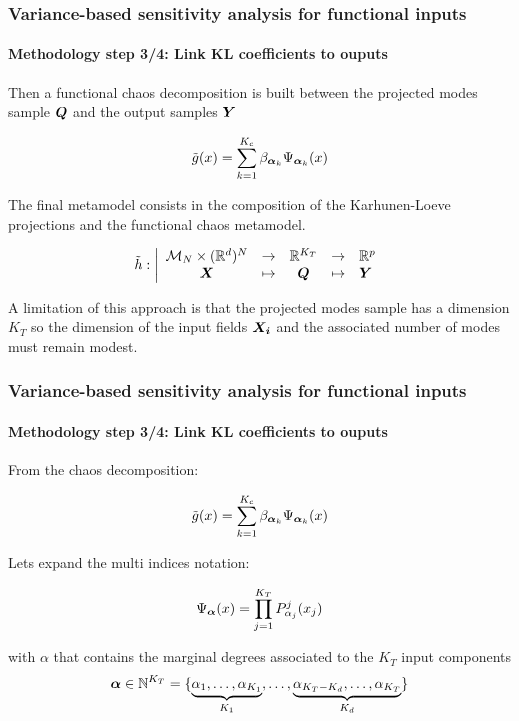 \documentclass[aspectratio=169]{beamer}
\begin{document}
\begin{frame}
\frametitle{Variance-based sensitivity analysis for functional inputs}

\framesubtitle{Methodology step 3/4: Link KL coefficients to ouputs}

Then a functional chaos decomposition is built between the projected modes\\
sample ${{\mathbf{\boldsymbol{{{\mathbf{\boldsymbol{{Q}}}}}}}}}$ and the output samples ${{\mathbf{\boldsymbol{{{\mathbf{\boldsymbol{{Y}}}}}}}}}$

$$
\tilde{g}(x) = \sum_{k=1}^{K_c} \beta_{{\mathbf{\boldsymbol{{\alpha}}}}_k} \Psi_{{\mathbf{\boldsymbol{{\alpha}}}}_k}(x)
$$

The final metamodel consists in the composition of the Karhunen-Loeve
projections and the functional chaos metamodel.

$$
    \tilde{h}: \left|
      \begin{array}{ccccl}
         {\mathcal M}_N \times (\mathbb{R}^d)^N & \rightarrow & \mathbb{R}^{K_T} & \rightarrow & \mathbb{R}^p \\
         {{\mathbf{\boldsymbol{{{\mathbf{\boldsymbol{{X}}}}}}}}} & \mapsto & {\mathbf{\boldsymbol{{Q}}}} & \mapsto & {\mathbf{\boldsymbol{{Y}}}}
      \end{array}
    \right.
$$

A limitation of this approach is that the projected modes sample has a dimension
$K_T$ so the dimension of the input fields ${{\mathbf{\boldsymbol{{{\mathbf{\boldsymbol{{X_i}}}}}}}}}$
and the associated number of modes must remain modest.

\end{frame}


\begin{frame}
\frametitle{Variance-based sensitivity analysis for functional inputs}

\framesubtitle{Methodology step 3/4: Link KL coefficients to ouputs}

From the chaos decomposition:

$$
\tilde{g}(x) = \sum_{k=1}^{K_c} \beta_{{\mathbf{\boldsymbol{{\alpha}}}}_k} \Psi_{{\mathbf{\boldsymbol{{\alpha}}}}_k}(x)
$$

Lets expand the multi indices notation:

$$
    \Psi_{{\mathbf{\boldsymbol{{\alpha}}}}}(x) = \prod_{j=1}^{K_T} P^j_{\alpha_j}(x_j)
$$

with $\alpha$ that contains the marginal degrees associated to the $K_T$ input components
$$
    {\mathbf{\boldsymbol{{\alpha}}}} \in \mathbb{N}^{K_T} = \{\underbrace{\alpha_1, \dots, \alpha_{K_1}}_{K_1},\dots,\underbrace{\alpha_{K_T-K_d}, \dots, \alpha_{K_T}}_{K_d}\}
$$

\end{frame}
\end{document}
